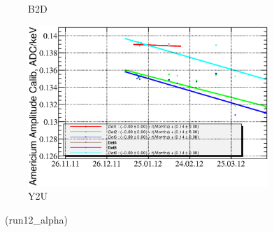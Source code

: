 \documentclass[a4paper,12pt]{article}
\begin{document}
\begin{figure}[h]
\begin{subfigure}[b]{0.5\textwidth}
\caption{B2D}
\end{subfigure}
\begin{subfigure}[b]{0.5\textwidth}
\includegraphics[width=\textwidth]{gfx/run12_alpha/Y2U/c_chAmGain_by_day_Y2U.eps}
\caption{Y2U}
\end{subfigure}
%
\caption{\amgainlabel\ (run12\_alpha)}
\end{figure}
\end{document}
